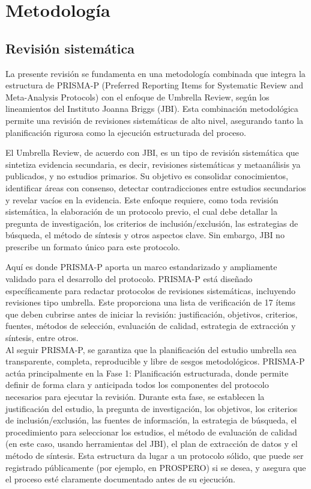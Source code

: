 \chapter{Metodología}
\section{Revisión sistemática}
La presente revisión se fundamenta en una metodología combinada que integra la estructura de 
PRISMA-P (Preferred Reporting Items for Systematic Review and Meta-Analysis Protocols) con el enfoque de 
Umbrella Review, según los lineamientos del Instituto Joanna Briggs (JBI). Esta combinación metodológica 
permite una revisión de revisiones sistemáticas de alto nivel, asegurando tanto la planificación rigurosa 
como la ejecución estructurada del proceso.

El Umbrella Review, de acuerdo con JBI, es un tipo de revisión sistemática que sintetiza 
evidencia secundaria, es decir, revisiones sistemáticas y metaanálisis ya publicados, y no 
estudios primarios. Su objetivo es consolidar conocimientos, identificar áreas con consenso,
 detectar contradicciones entre estudios secundarios y revelar vacíos en la evidencia. Este 
 enfoque requiere, como toda revisión sistemática, la elaboración de un protocolo previo, 
 el cual debe detallar la pregunta de investigación, los criterios de inclusión/exclusión, 
 las estrategias de búsqueda, el método de síntesis y otros aspectos clave. Sin embargo, 
 JBI no prescribe un formato único para este protocolo.

Aquí es donde PRISMA-P aporta un marco estandarizado y ampliamente validado para el 
desarrollo del protocolo. PRISMA-P está diseñado específicamente para redactar protocolos 
de revisiones sistemáticas, incluyendo revisiones tipo umbrella. Este proporciona una lista
de verificación de 17 ítems que deben cubrirse antes de iniciar la revisión: justificación,
objetivos, criterios, fuentes, métodos de selección, evaluación de calidad, estrategia de 
extracción y síntesis, entre otros. \\Al seguir PRISMA-P, se garantiza que la planificación 
del estudio umbrella sea transparente, completa, reproducible y libre de sesgos metodológicos. 
PRISMA-P actúa principalmente en la Fase 1: Planificación estructurada, donde permite definir de forma clara y anticipada todos los componentes del protocolo necesarios para ejecutar la revisión. Durante esta fase, se establecen la justificación del estudio, la pregunta de investigación, los objetivos, los criterios de inclusión/exclusión, las fuentes de información, la estrategia de búsqueda, el procedimiento para seleccionar los estudios, el método de evaluación de calidad (en este caso, usando herramientas del JBI),
el plan de extracción de datos y el método de síntesis. Esta estructura da lugar a un protocolo sólido, 
que puede ser registrado públicamente (por ejemplo, en PROSPERO) si se desea, y asegura que el proceso esté claramente documentado antes de su ejecución.


